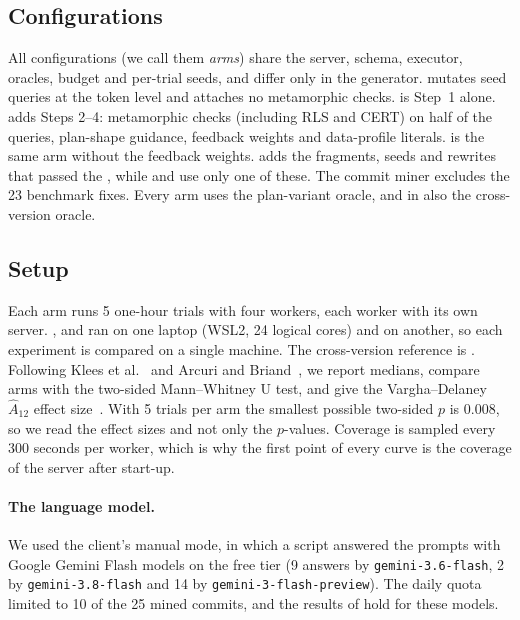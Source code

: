 \subsection{Configurations}
\label{sec:baselines}

All configurations (we call them \emph{arms}) share the server, schema,
executor, oracles, budget and per-trial seeds, and differ only in the generator.
 mutates seed queries at the token level and attaches no metamorphic
checks.  is Step~1 alone.  adds Steps 2--4:
metamorphic checks (including RLS and CERT) on half of the queries, plan-shape
guidance, feedback weights and data-profile literals.  is the same arm without the feedback weights.  adds the
fragments, seeds and rewrites that passed the \gate, while 
and  use only one of these. The commit miner excludes the 23
benchmark fixes. Every arm uses the plan-variant oracle, and in  also
the cross-version oracle.

\subsection{Setup}
\label{sec:setup}
Each arm runs 5 one-hour trials with four workers, each worker with its own
server. ,  and  ran on one laptop (WSL2, 24 logical
cores) and  on another, so each experiment is compared on a single
machine. The cross-version reference is . Following Klees et
al.~\cite{klees2018evaluating} and Arcuri and Briand~\cite{arcuri2011practical},
we report medians, compare arms with the two-sided Mann--Whitney U test, and give
the Vargha--Delaney $\hat{A}_{12}$ effect size~\cite{vargha2000a12}. With 5
trials per arm the smallest possible two-sided $p$ is 0.008, so we read the
effect sizes and not only the $p$-values. Coverage is sampled every 300 seconds
per worker, which is why the first point of every curve is the coverage of the
server after start-up.

\paragraph{The language model.} We used the client's manual mode, in which a
script answered the prompts with Google Gemini Flash models on the free tier (9
answers by \texttt{gemini-3.6-flash}, 2 by \texttt{gemini-3.8-flash} and 14 by
\texttt{gemini-3-flash-preview}). The daily quota limited  to 10 of the
25 mined commits, and the results of  hold for these models.

